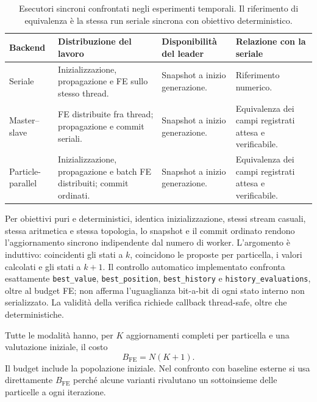 \begin{table}[tbp]
\centering\small
\caption{Esecutori sincroni confrontati negli esperimenti temporali. Il riferimento di equivalenza \`e la stessa run seriale sincrona con obiettivo deterministico.}
\label{tab:execution-modes}
\begin{tabularx}{\textwidth}{@{}p{2.7cm}X X p{3.25cm}@{}}
\toprule
Backend & Distribuzione del lavoro & Disponibilit\`a del leader & Relazione con la seriale \\
\midrule
Seriale & Inizializzazione, propagazione e FE sullo stesso thread. & Snapshot a inizio generazione. & Riferimento numerico.\\
Master--slave & FE distribuite fra thread; propagazione e commit seriali. & Snapshot a inizio generazione. & Equivalenza dei campi registrati attesa e verificabile.\\
Particle-parallel & Inizializzazione, propagazione e batch FE distribuiti; commit ordinati. & Snapshot a inizio generazione. & Equivalenza dei campi registrati attesa e verificabile.\\
\bottomrule
\end{tabularx}
\end{table}

Per obiettivi puri e deterministici, identica inizializzazione, stessi stream casuali, stessa aritmetica e stessa topologia, lo snapshot e il commit ordinato rendono l'aggiornamento sincrono indipendente dal numero di worker. L'argomento \`e induttivo: coincidenti gli stati a $k$, coincidono le proposte per particella, i valori calcolati e gli stati a $k+1$. Il controllo automatico implementato confronta esattamente \texttt{best\_value}, \texttt{best\_position}, \texttt{best\_history} e \texttt{history\_evaluations}, oltre al budget FE; non afferma l'uguaglianza bit-a-bit di ogni stato interno non serializzato. La validit\`a della verifica richiede callback thread-safe, oltre che deterministiche.

Tutte le modalit\`a hanno, per $K$ aggiornamenti completi per particella e una valutazione iniziale, il costo
\begin{equation}
 B_{\mathrm{FE}}=N(K+1).
 \label{eq:fe-budget}
\end{equation}
Il budget include la popolazione iniziale. Nel confronto con baseline esterne si usa direttamente $B_{\mathrm{FE}}$ perch\'e alcune varianti rivalutano un sottoinsieme delle particelle a ogni iterazione.

